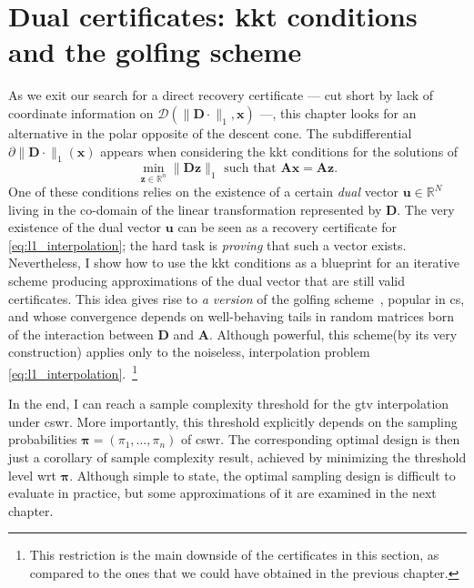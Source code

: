 \chapter{Dual certificates: \texorpdfstring{\acrshort{kkt}}{KKT} conditions and the golfing scheme}\label{ch:inexact_dual}

As we exit our search for a direct recovery certificate --- cut short by lack of coordinate information on $\mathcal{D}( \|\mathbf{D} \cdot \|_1, \mathbf{x})$ ---, this chapter looks for an alternative in the polar opposite of the descent cone. The subdifferential $\partial \|\mathbf{D} \cdot\|_1(\mathbf{x})$ appears when considering the \acrfull{kkt} conditions for the solutions of
\begin{equation}
    \underset{\mathbf{z} \in \mathbb{R}^{n}}{\min} \| \mathbf{D z} \|_1 \text{ such that } \mathbf{Ax = Az} \tag{P1}.
\end{equation}
One of these conditions relies on the existence of a certain \emph{dual} vector $\mathbf{u} \in \mathbb{R}^{N}$ living in the co-domain of the linear transformation represented by $\mathbf{D}$. The very existence of the dual vector $\mathbf{u}$ can be seen as a recovery certificate for \eqref{eq:l1_interpolation}; the hard task is \emph{proving} that such a vector exists. Nevertheless, I show how to use the \acrshort{kkt} conditions as a blueprint for an iterative scheme producing approximations of the dual vector that are still valid certificates. This idea gives rise to \emph{a version} of the golfing scheme~\cite{gross2011}, popular in \acrlong{cs}, and whose convergence depends on well-behaving tails in random matrices born of the interaction between $\mathbf{D}$ and $\mathbf{A}$. Although powerful, this scheme(by its very construction) applies only to the noiseless, interpolation problem \eqref{eq:l1_interpolation}.~\footnote{This restriction is the main downside of the certificates in this section, as compared to the ones that we could have obtained in the previous chapter.}

In the end, I can reach a sample complexity threshold for the \acrshort{gtv} interpolation under \acrfull{cswr}. More importantly, this threshold explicitly depends on the sampling probabilities $\bm{\pi} = (\pi_1, \dots, \pi_n)$ of \acrshort{cswr}. The corresponding optimal design is then just a corollary of sample complexity result, achieved by minimizing the threshold level \acrlong{wrt} $\bm{\pi}$. Although simple to state, the optimal sampling design is difficult to evaluate in practice, but some approximations of it are examined in the next chapter.


